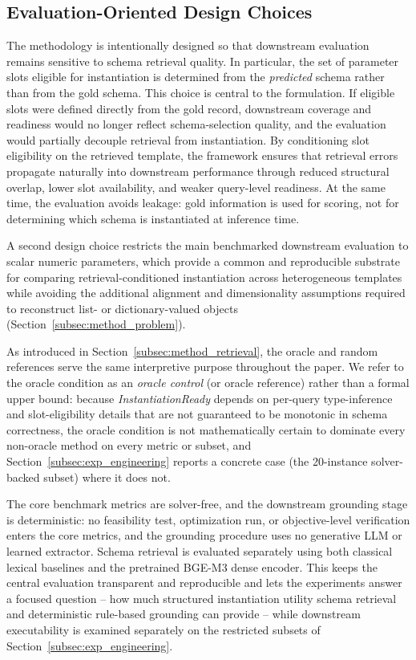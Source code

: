 \documentclass[pdflatex,sn-basic,Numbered]{sn-jnl}
\begin{document}
\subsection{Evaluation-Oriented Design Choices}
\label{subsec:method_design}

The methodology is intentionally designed so that downstream evaluation remains sensitive to schema retrieval quality. In particular, the set of parameter slots eligible for instantiation is determined from the \emph{predicted} schema rather than from the gold schema. This choice is central to the formulation. If eligible slots were defined directly from the gold record, downstream coverage and readiness would no longer reflect schema-selection quality, and the evaluation would partially decouple retrieval from instantiation. By conditioning slot eligibility on the retrieved template, the framework ensures that retrieval errors propagate naturally into downstream performance through reduced structural overlap, lower slot availability, and weaker query-level readiness. At the same time, the evaluation avoids leakage: gold information is used for scoring, not for determining which schema is instantiated at inference time.

A second design choice restricts the main benchmarked downstream evaluation to scalar numeric parameters, which provide a common and reproducible substrate for comparing retrieval-conditioned instantiation across heterogeneous templates while avoiding the additional alignment and dimensionality assumptions required to reconstruct list- or dictionary-valued objects (Section~\ref{subsec:method_problem}).

As introduced in Section~\ref{subsec:method_retrieval}, the oracle and random references serve the same interpretive purpose throughout the paper. We refer to the oracle condition as an \emph{oracle control} (or oracle reference) rather than a formal upper bound: because \textit{InstantiationReady} depends on per-query type-inference and slot-eligibility details that are not guaranteed to be monotonic in schema correctness, the oracle condition is not mathematically certain to dominate every non-oracle method on every metric or subset, and Section~\ref{subsec:exp_engineering} reports a concrete case (the 20-instance solver-backed subset) where it does not.

The core benchmark metrics are solver-free, and the downstream grounding stage is deterministic: no feasibility test, optimization run, or objective-level verification enters the core metrics, and the grounding procedure uses no generative LLM or learned extractor. Schema retrieval is evaluated separately using both classical lexical baselines and the pretrained BGE-M3 dense encoder. This keeps the central evaluation transparent and reproducible and lets the experiments answer a focused question -- how much structured instantiation utility schema retrieval and deterministic rule-based grounding can provide -- while downstream executability is examined separately on the restricted subsets of Section~\ref{subsec:exp_engineering}.
\end{document}
